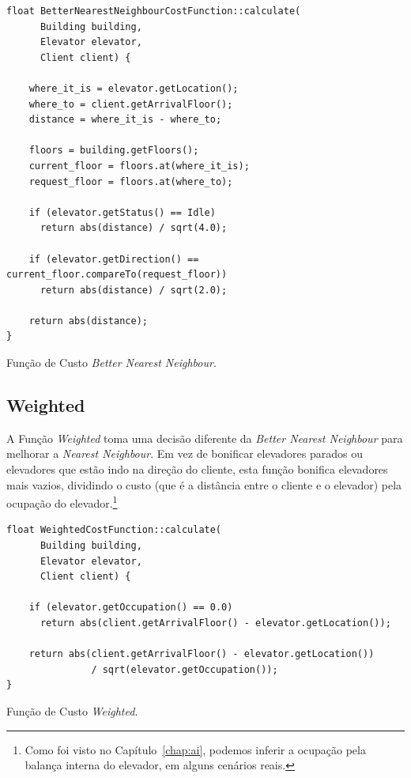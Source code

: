 \begin{algorithm}[htb!]
  \centering
  \begin{verbatim}
float BetterNearestNeighbourCostFunction::calculate(
      Building building,
      Elevator elevator,
      Client client) {

    where_it_is = elevator.getLocation();
    where_to = client.getArrivalFloor();
    distance = where_it_is - where_to;

    floors = building.getFloors();
    current_floor = floors.at(where_it_is);
    request_floor = floors.at(where_to);

    if (elevator.getStatus() == Idle)
      return abs(distance) / sqrt(4.0);

    if (elevator.getDirection() == current_floor.compareTo(request_floor))
      return abs(distance) / sqrt(2.0);

    return abs(distance);
}
  \end{verbatim}
  \caption{\label{alg:bnn_cf}Função de Custo \textit{Better Nearest Neighbour}.}
\end{algorithm}

\subsection{\label{model:costfunctions:weighted}Weighted}
A Função \textit{Weighted} toma uma decisão diferente da \textit{Better Nearest
  Neighbour} para melhorar a \textit{Nearest Neighbour}. Em vez de bonificar
elevadores parados ou elevadores que estão indo na direção do cliente, esta
função bonifica elevadores mais vazios, dividindo o custo (que é a distância
entre o cliente e o elevador) pela ocupação do elevador.\footnote{Como foi visto
no Capítulo~\ref{chap:ai}, podemos inferir a ocupação pela balança interna do elevador, em
alguns cenários reais.}

\begin{algorithm}[htb!]
  \centering
  \begin{verbatim}
float WeightedCostFunction::calculate(
      Building building,
      Elevator elevator,
      Client client) {

    if (elevator.getOccupation() == 0.0)
      return abs(client.getArrivalFloor() - elevator.getLocation());

    return abs(client.getArrivalFloor() - elevator.getLocation())
               / sqrt(elevator.getOccupation());
}
  \end{verbatim}
  \caption{\label{alg:weighted_cf}Função de Custo \textit{Weighted}.}
\end{algorithm}

